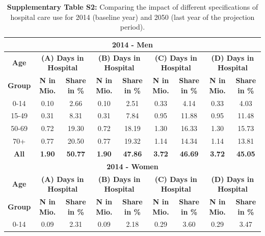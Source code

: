 \begin{landscape}



\begin{table}[htbp]
  \centering
  \caption*{	\textbf{Supplementary Table S2:} Comparing the impact of different 
  				specifications of hospital care use for 2014 (baseline year) and 
  				2050 (last year of the projection period).}
    \begin{tabular}{c|cc|cc|cc|cc}
    \toprule
    \multicolumn{9}{c}{\textbf{2014  - Men}} \\
    \midrule
    \textbf{Age} & \multicolumn{2}{c|}{\textbf{(A) Days in Hospital}} & \multicolumn{2}{c|}{\textbf{(B) Days in Hospital}} & \multicolumn{2}{c|}{\textbf{(C) Days in Hospital}} & \multicolumn{2}{c}{\textbf{(D) Days in Hospital}} \\
    \textbf{Group} & \textbf{N in Mio.} & \textbf{Share in \%} & \textbf{N in Mio.} & \textbf{Share in \%} & \textbf{N in Mio.} & \textbf{Share in \%} & \textbf{N in Mio.} & \textbf{Share in \%} \\
    \midrule
    0-14  & 0.10   & 2.66   & 0.10   & 2.51   & 0.33   &  4.14   &  0.33   &  4.03 \\
    15-49 & 0.31   & 8.31   & 0.31   & 7.84   & 0.95   &  11.88  &  0.95   & 11.48 \\
    50-69 & 0.72   & 19.30  & 0.72   & 18.19  & 1.30   &  16.33  &  1.30   & 15.73 \\
    70+   & 0.77   & 20.50  & 0.77   & 19.32  & 1.14   &  14.34  &  1.14   & 13.81 \\
    \midrule
    \textbf{All } & \textbf{1.90} & \textbf{50.77} & \textbf{1.90} & \textbf{47.86} & \textbf{3.72} & \textbf{46.69} & \textbf{3.72} & \textbf{45.05} \\
    \midrule
    \multicolumn{9}{c}{\textbf{2014  - Women}} \\
    \midrule
    \textbf{Age } & \multicolumn{2}{c|}{\textbf{(A) Days in Hospital}} & \multicolumn{2}{c|}{\textbf{(B) Days in Hospital}} & \multicolumn{2}{c|}{\textbf{(C) Days in Hospital}} & \multicolumn{2}{c}{\textbf{(D) Days in Hospital}} \\
    \textbf{Group} & \textbf{N in Mio.} & \textbf{Share in \%} & \textbf{N in Mio.} & \textbf{Share in \%} & \textbf{N in Mio.} & \textbf{Share in \%} & \textbf{N in Mio.} & \textbf{Share in \%} \\
    \midrule
    0-14  & 0.09  & 2.31  & 0.09  & 2.18  & 0.29  & 3.60  & 0.29  & 3.47 \\

\end{tabular}
\end{table}
\end{landscape}
